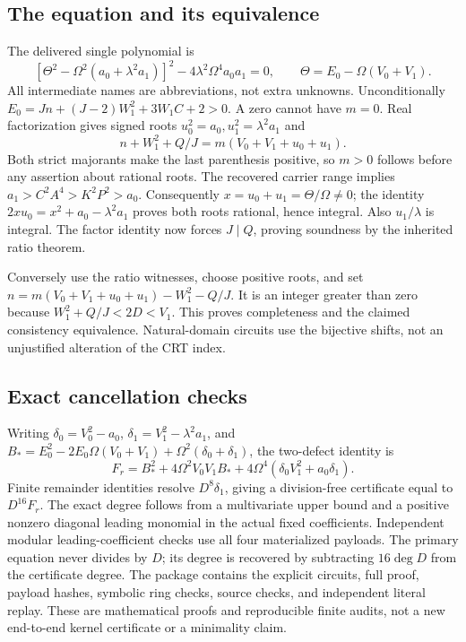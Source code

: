 \subsection{The equation and its equivalence}
The delivered single polynomial is
\[
 \boxed{\quad
 [\Theta^2-\Omega^2(a_0+\lambda^2a_1)]^2
           -4\lambda^2\Omega^4a_0a_1=0,\qquad
 \Theta=E_0-\Omega(V_0+V_1).
 \quad}
\]
All intermediate names are abbreviations, not extra unknowns.
Unconditionally
\(E_0=Jn+(J-2)W_1^2+3W_1C+2>0\).
A zero cannot have \(m=0\).  Real factorization gives signed roots
\(u_0^2=a_0,u_1^2=\lambda^2a_1\) and
\[
 n+W_1^2+Q/J=m(V_0+V_1+u_0+u_1).
\]
Both strict majorants make the last parenthesis positive, so \(m>0\)
follows before any assertion about rational roots.  The recovered carrier
range implies \(a_1>C^2A^4>K^2P^2>a_0\).  Consequently
\(x=u_0+u_1=\Theta/\Omega\ne0\); the identity
\(2xu_0=x^2+a_0-\lambda^2a_1\) proves both roots rational, hence integral.
Also \(u_1/\lambda\) is integral.  The factor identity now forces
\(J\mid Q\), proving soundness by the inherited ratio theorem.

Conversely use the ratio witnesses, choose positive roots, and set
\(n=m(V_0+V_1+u_0+u_1)-W_1^2-Q/J\).
It is an integer greater than zero because
\(W_1^2+Q/J<2D<V_1\).  This proves completeness and the claimed
consistency equivalence.  Natural-domain circuits use the bijective shifts,
not an unjustified alteration of the CRT index.

\subsection{Exact cancellation checks}
Writing \(\delta_0=V_0^2-a_0\),
\(\delta_1=V_1^2-\lambda^2a_1\), and
\(B_*=E_0^2-2E_0\Omega(V_0+V_1)+\Omega^2(\delta_0+\delta_1)\),
the two-defect identity is
\[
 F_r=B_*^2+4\Omega^2V_0V_1B_*+
             4\Omega^4(\delta_0V_1^2+a_0\delta_1).
\]
Finite remainder identities resolve \(D^8\delta_1\), giving a
division-free certificate equal to \(D^{16}F_r\).
The exact degree follows from a multivariate upper bound and a positive
nonzero diagonal leading monomial in the actual fixed coefficients.
Independent modular leading-coefficient checks use all four materialized
payloads.  The primary equation never divides by \(D\); its degree is
recovered by subtracting \(16\deg D\) from the certificate degree.
The package contains the explicit circuits, full proof, payload hashes,
symbolic ring checks, source checks, and independent literal replay.
These are mathematical proofs and reproducible finite audits, not a new
end-to-end kernel certificate or a minimality claim.
